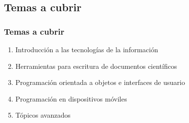 \begin{frame}
\section{Temas a cubrir}
\frametitle{Temas a cubrir }
\begin{enumerate}

\item Introducción a las tecnolog\'ias de la informaci\'on
\item Herramientas para escritura de documentos cient\'ificos
\item Programaci\'on orientada a objetos e interfaces de usuario
\item Programaci\'on en dispositivos m\'oviles
\item T\'opicos avanzados
\end{enumerate}

\end{frame}

